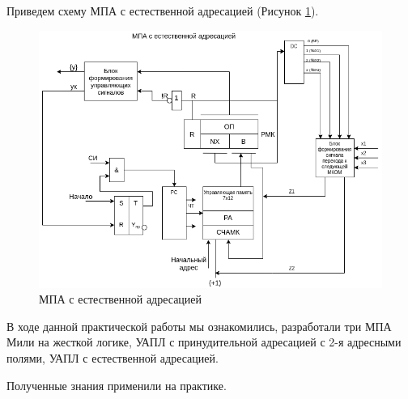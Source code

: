 \documentclass[a4paper,14pt]{extarticle}
\begin{document}
Приведем схему МПА с естественной адресацией (Рисунок \ref{fig:nature-scheme}).
\begin{figure}[htpb]
	\centering
	\includegraphics[width=0.8\linewidth]{images/nature-scheme}
	\caption{МПА с естественной адресацией}
	\label{fig:nature-scheme}
\end{figure}
	В ходе данной практической работы мы ознакомились, разработали три МПА Мили на жесткой логике, УАПЛ с принудительной адресацией с 2-я адресными полями, УАПЛ с естественной адресацией.
	
	Полученные знания применили на практике.
	
	
\end{document}
